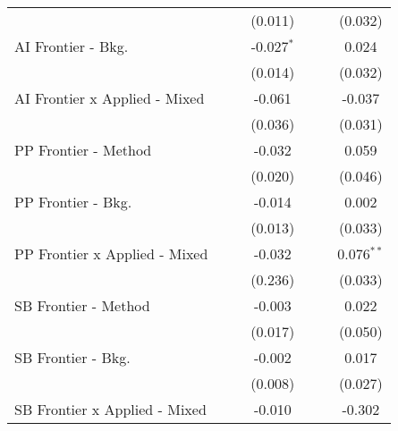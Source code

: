 \begin{tabular}{lcccccc}
                                 &                &                & (0.011)        &                &              & (0.032)\\   
   AI Frontier - Bkg.            &                &                & -0.027$^{*}$   &                &              & 0.024\\   
                                 &                &                & (0.014)        &                &              & (0.032)\\   
   AI Frontier x Applied - Mixed &                &                & -0.061         &                &              & -0.037\\   
                                 &                &                & (0.036)        &                &              & (0.031)\\   
   PP Frontier - Method          &                &                & -0.032         &                &              & 0.059\\   
                                 &                &                & (0.020)        &                &              & (0.046)\\   
   PP Frontier - Bkg.            &                &                & -0.014         &                &              & 0.002\\   
                                 &                &                & (0.013)        &                &              & (0.033)\\   
   PP Frontier x Applied - Mixed &                &                & -0.032         &                &              & 0.076$^{**}$\\   
                                 &                &                & (0.236)        &                &              & (0.033)\\   
   SB Frontier - Method          &                &                & -0.003         &                &              & 0.022\\   
                                 &                &                & (0.017)        &                &              & (0.050)\\   
   SB Frontier - Bkg.            &                &                & -0.002         &                &              & 0.017\\   
                                 &                &                & (0.008)        &                &              & (0.027)\\   
   SB Frontier x Applied - Mixed &                &                & -0.010         &                &              & -0.302\\   

\end{tabular}
